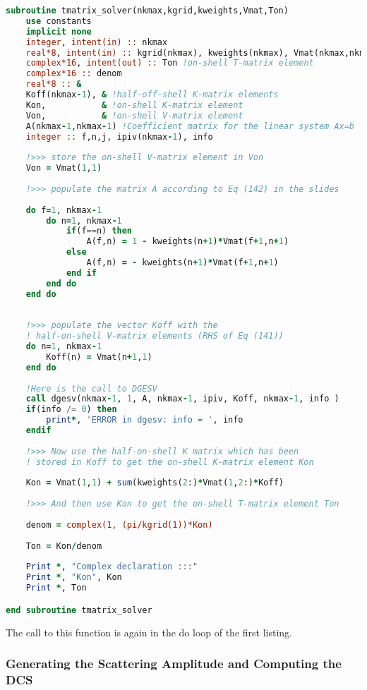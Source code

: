 \documentclass{article}
\begin{document}
    \begin{lstlisting}[language=fortran]
subroutine tmatrix_solver(nkmax,kgrid,kweights,Vmat,Ton)
	use constants
	implicit none
	integer, intent(in) :: nkmax
	real*8, intent(in) :: kgrid(nkmax), kweights(nkmax), Vmat(nkmax,nkmax)
	complex*16, intent(out) :: Ton !on-shell T-matrix element
	complex*16 :: denom
	real*8 :: &
	Koff(nkmax-1), & !half-off-shell K-matrix elements
	Kon,           & !on-shell K-matrix element
	Von,           & !on-shell V-matrix element
	A(nkmax-1,nkmax-1) !Coefficient matrix for the linear system Ax=b
	integer :: f,n,j, ipiv(nkmax-1), info
	
	!>>> store the on-shell V-matrix element in Von
	Von = Vmat(1,1)
	
	!>>> populate the matrix A according to Eq (142) in the slides
	
	do f=1, nkmax-1
		do n=1, nkmax-1
			if(f==n) then
				A(f,n) = 1 - kweights(n+1)*Vmat(f+1,n+1)
			else
				A(f,n) = - kweights(n+1)*Vmat(f+1,n+1)
			end if
		end do
	end do
	
	
	!>>> populate the vector Koff with the 
	! half-on-shell V-matrix elements (RHS of Eq (141)) 
	do n=1, nkmax-1
		Koff(n) = Vmat(n+1,1) 
	end do
	
	!Here is the call to DGESV
	call dgesv(nkmax-1, 1, A, nkmax-1, ipiv, Koff, nkmax-1, info )
	if(info /= 0) then
		print*, 'ERROR in dgesv: info = ', info
	endif
	
	!>>> Now use the half-on-shell K matrix which has been 
	! stored in Koff to get the on-shell K-matrix element Kon
	
	Kon = Vmat(1,1) + sum(kweights(2:)*Vmat(1,2:)*Koff)
	
	!>>> And then use Kon to get the on-shell T-matrix element Ton
	
	denom = complex(1, (pi/kgrid(1))*Kon)
	
	Ton = Kon/denom
	
	Print *, "Complex declaration :::"
	Print *, "Kon", Kon
	Print *, Ton

end subroutine tmatrix_solver

    \end{lstlisting}
    The call to this function is again in the do loop of the first  listing.
    
    \subsubsection{Generating the Scattering Amplitude and Computing the DCS}
    \label{ScatteringAmp}
    
\end{document}
